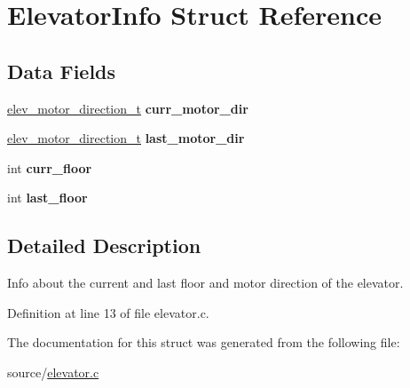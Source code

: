 \hypertarget{structElevatorInfo}{}\section{Elevator\+Info Struct Reference}
\label{structElevatorInfo}
\subsection*{Data Fields}
\begin{DoxyCompactItemize}
\item 
\hyperlink{elev__driver_8h_a2256dfd58fecce253106f83fd2ed607f}{elev\+\_\+motor\+\_\+direction\+\_\+t} {\bfseries curr\+\_\+motor\+\_\+dir}\hypertarget{structElevatorInfo_a434359d6c197328f21b3606bcc9e230f}{}\label{structElevatorInfo_a434359d6c197328f21b3606bcc9e230f}

\item 
\hyperlink{elev__driver_8h_a2256dfd58fecce253106f83fd2ed607f}{elev\+\_\+motor\+\_\+direction\+\_\+t} {\bfseries last\+\_\+motor\+\_\+dir}\hypertarget{structElevatorInfo_a8af2f20601f00ef358921cbc8ac74075}{}\label{structElevatorInfo_a8af2f20601f00ef358921cbc8ac74075}

\item 
int {\bfseries curr\+\_\+floor}\hypertarget{structElevatorInfo_a5c1fa5a5b14e7ec0f300d9243482f67e}{}\label{structElevatorInfo_a5c1fa5a5b14e7ec0f300d9243482f67e}

\item 
int {\bfseries last\+\_\+floor}\hypertarget{structElevatorInfo_a867568f3fa5225973267ce25ee766688}{}\label{structElevatorInfo_a867568f3fa5225973267ce25ee766688}

\end{DoxyCompactItemize}


\subsection{Detailed Description}
Info about the current and last floor and motor direction of the elevator. 

Definition at line 13 of file elevator.\+c.



The documentation for this struct was generated from the following file\+:\begin{DoxyCompactItemize}
\item 
source/\hyperlink{elevator_8c}{elevator.\+c}\end{DoxyCompactItemize}
